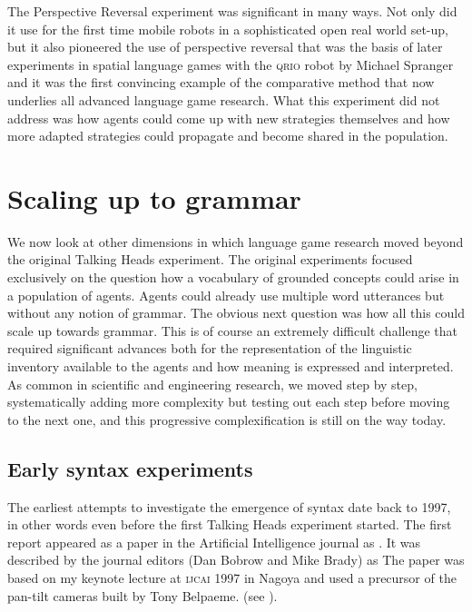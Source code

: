 The Perspective Reversal experiment was significant in many ways. Not only did it use for the first time mobile robots in a 
sophisticated open real world set-up, but it also pioneered the use of perspective reversal that was the basis of later 
experiments in spatial language games with the \textsc{qrio} robot by Michael Spranger and it was the first convincing example of 
the comparative method that now underlies all advanced language game research. What this experiment did not address
was how agents could come up with new strategies themselves and how more adapted strategies could propagate and become 
shared in the population. 

\section{Scaling up to grammar}

We now look at other dimensions in which language game research moved beyond the original 
Talking Heads experiment. 
The original experiments focused exclusively
on the question how a vocabulary of grounded concepts could arise in a population 
of agents. Agents could already use multiple word utterances but without any notion of grammar. 
The obvious next question was how all this could scale up towards grammar. This is of course an extremely difficult
challenge that required significant advances both for the representation of the linguistic inventory 
available to the agents and how meaning is expressed and interpreted. As common in 
scientific and engineering research, we moved step by step, systematically adding more complexity but 
testing out each step before moving to the next one, and this progressive complexification is still on the way today.

\subsection{Early syntax experiments}

The earliest attempts to investigate the emergence of syntax date back to 1997, in other words even before 
the first Talking Heads experiment started. The first report 
appeared as a paper in the Artificial Intelligence journal as \citet{Steels:1998}. 
It was described by the journal editors (Dan Bobrow and 
Mike Brady) as  The paper was based on my keynote 
lecture at \textsc{ijcai} 1997 in Nagoya and used a precursor of the pan-tilt cameras built by Tony Belpaeme. 
(see ). 

